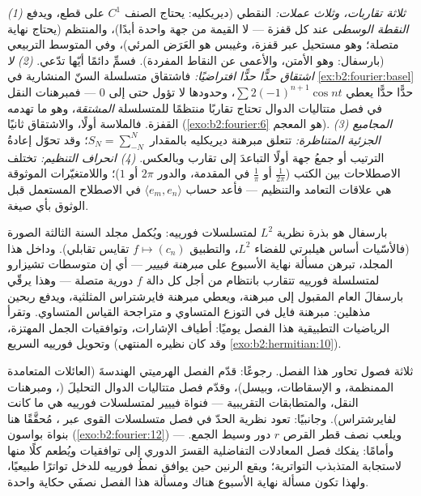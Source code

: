\begin{remark}
\emph{(1) ثلاثة تقاربات، وثلاث عملات:} النقطي
(ديريكليه: يحتاج الصنف $C^1$ على قطع، ويدفع \emph{النقطة الوسطى} عند
كل قفزة --- لا القيمة من جهة واحدة أبدًا)، والمنتظم (يحتاج نهاية
متصلة؛ وهو مستحيل عبر قفزة، وغيبس هو العَرَض
المرئي)، وفي المتوسط التربيعي (بارسفال: وهو الأمتن،
والأعمى عن النقاط المفردة). فسمِّ دائمًا أيّها
تدّعي. \emph{(2) لا اشتقاق حدًّا حدًّا
افتراضيًا:} فاشتقاق متسلسلة السنّ المنشارية في
\cref{ex:b2:fourier:basel} حدًّا حدًّا يعطي $\sum
2(-1)^{n+1}\cos nt$، وحدودها لا تؤول حتى إلى $0$ ---
فمبرهنات النقل في فصل متتاليات الدوال تحتاج
تقاربًا منتظمًا للمتسلسلة \emph{المشتقة}، وهو ما تهدمه
القفزة. فالملاسة أولًا، والاشتقاق ثانيًا
(\cref{exo:b2:fourier:6} هو المعجم). \emph{(3)
المجاميع الجزئية المتناظرة:} تتعلق مبرهنة ديريكليه بالمقدار $S_N =
\sum_{-N}^{N}$؛ وقد تحوّل إعادةُ الترتيب أو جمعُ جهة أولًا
التباعدَ إلى تقارب وبالعكس. \emph{(4)
انحراف التنظيم:} تختلف الاصطلاحات بين الكتب
($\frac{1}{2\pi}$ أو $\frac1\pi$ في المقدمة، والدور $2\pi$ أو
$1$)؛ واللامتغيّرات الموثوقة هي علاقات التعامد والتنظيم
--- فأعد حساب $\langle e_m, e_n\rangle$ في الاصطلاح
المستعمل قبل الوثوق بأي صيغة.
\end{remark}

\begin{remark}
بارسفال هو بذرة نظرية $L^2$ لمتسلسلات فورييه: ويُكمل
مجلد السنة الثالثة الصورة (فالأسّيات أساس
هيلبرتي للفضاء $L^2$، والتطبيق $f \mapsto (c_n)$
تقايس تقابلي). وداخل هذا المجلد، تبرهن مسألة نهاية الأسبوع
على \emph{مبرهنة فييير} --- أي إن متوسطات تشيزارو
لمتسلسلة فورييه تتقارب بانتظام من أجل كل دالة $f$ دورية
متصلة --- وهذا يرقّي بارسفالَ العام المقبول إلى
مبرهنة، ويعطي مبرهنة فايرشتراس المثلثية، ويدفع
ربحين مذهلين: مبرهنة فايل في التوزع المتساوي و
متراجحة القياس المتساوي. وتقرأ الرياضيات التطبيقية هذا
الفصل يوميًا: أطياف الإشارات، وتوافقيات الجمل
المهتزة، وتحويل فورييه السريع (وقد كان نظيره المنتهي
\cref{exo:b2:hermitian:10}).
\end{remark}

\begin{remark}
ثلاثة فصول تحاور هذا الفصل. رجوعًا: قدّم الفصل
الهرميتي الهندسةَ (العائلات المتعامدة الممنظمة، و
الإسقاطات، وبيسل)، وقدّم فصل متتاليات الدوال
التحليلَ (، ومبرهنات النقل، والمتطابقات
التقريبية --- فنواة فييير لمتسلسلات فورييه هي ما كانت
 لفايرشتراس). وجانبيًا: تعود
نظرية الحدّ في فصل متسلسلات القوى عبر ، مُحقَّقًا هنا بنواة بواسون
(\cref{exo:b2:fourier:12}) --- ويلعب نصف قطر القرص $r$
دور وسيط الجمع. وأمامًا: يفكك فصل
المعادلات التفاضلية القسرَ الدوري
إلى توافقيات ويُطعم كلًا منها لاستجابة المتذبذب
التواترية؛ ويقع الرنين حين يوافق نمطُ فورييه للدخل
تواترًا طبيعيًا، ولهذا تكون مسألة نهاية الأسبوع هناك
ومسألة هذا الفصل نصفَي حكاية واحدة.
\end{remark}

